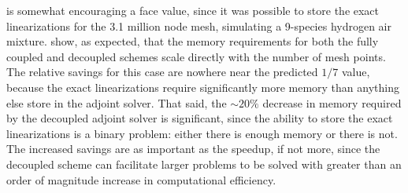  is somewhat encouraging a face value, since it was
possible to store the exact linearizations for the 3.1 million node mesh,
simulating a 9-species hydrogen air mixture.   show, as
expected, that the memory requirements for both the fully coupled and decoupled
schemes scale directly with the number of mesh points.  The relative savings for
this case are nowhere near the predicted $1/7$ value, because the exact
linearizations require significantly more memory than anything else store in the
adjoint solver.  That said, the $\sim 20\%$ decrease in memory required by the
decoupled adjoint solver is significant, since the ability to store the exact
linearizations is a binary problem: either there is enough memory or there is
not.  The increased savings are as important as the speedup, if not more, since
the decoupled scheme can facilitate larger problems to be solved with greater
than an order of magnitude increase in computational efficiency.
